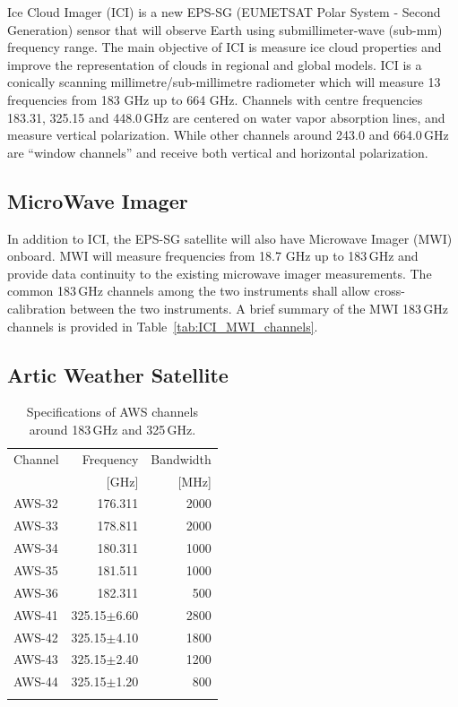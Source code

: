 \documentclass[amt, manuscript]{copernicus}
\begin{document}
Ice Cloud Imager (ICI) is a new EPS-SG (EUMETSAT Polar System - Second Generation) sensor that will observe  Earth using submillimeter-wave (sub-mm) frequency range. The main objective of ICI is measure ice cloud properties and improve the representation of clouds in regional and global models. ICI is a conically scanning millimetre/sub-millimetre radiometer which will measure 13 frequencies from 183 GHz up to 664 GHz. Channels with centre frequencies 183.31, 325.15 and 448.0\,GHz are centered on water vapor absorption lines, and measure vertical polarization. While other channels around 243.0 and 664.0\,GHz are ``window channels'' and receive both vertical and horizontal polarization. 

\subsection{MicroWave Imager}
%
In addition to ICI, the EPS-SG satellite will also have Microwave Imager (MWI) onboard. MWI will measure frequencies from 18.7 GHz up to 183\,GHz and provide data continuity to the existing microwave imager measurements. The common 183\,GHz channels among the two instruments shall allow cross-calibration between the two instruments. A brief summary of the MWI 183\,GHz channels is provided in Table~\ref{tab:ICI_MWI_channels}.

\subsection{Artic Weather Satellite}
%
\begin{table}[t]
	\caption{Specifications of AWS channels around 183\,GHz and 325\,GHz.}
	\label{tab:specifications_AWS}	
	\begin{tabular}{lrr}
		\tophline
		Channel & Frequency 	& Bandwidth  \\
		& [GHz]			& [MHz]		\\
		\middlehline
		AWS-32	&	176.311    & 2000 		\\
		AWS-33	&	178.811    & 2000 		\\
		AWS-34	&	180.311    & 1000 		\\
		AWS-35	&	181.511    & 1000 		 \\
		AWS-36	&	182.311    & \phantom{0}500 	 \\
		AWS-41    & 325.15$\pm$6.60    & 2800 \\
		AWS-42    & 325.15$\pm$4.10    & 1800  \\
		AWS-43    & 325.15$\pm$2.40    & 1200 \\
		AWS-44    & 325.15$\pm$1.20    & \phantom{0}800  \\
		\bottomhline
	\end{tabular}
	\belowtable{} %
\end{table}
\end{document}
